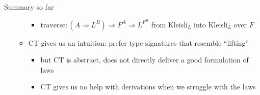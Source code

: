 \documentclass[english]{beamer}
\begin{document}
\begin{frame}{Summary so far}
\begin{itemize}
\begin{itemize}
\begin{itemize}
\item $\text{traverse}:\left(A\Rightarrow L^{B}\right)\Rightarrow F^{A}\Rightarrow L^{F^{B}}$
\textendash{} from Kleisli$_{L}$ into Kleisli$_{L}$ over $F$
\end{itemize}
\item CT gives us an intuition: prefer type signatures that resemble ``lifting''
\begin{itemize}
\item but CT is abstract, does not directly deliver a good formulation of
laws
\item CT gives us no help with derivations when we struggle with the laws
\end{itemize}
\end{itemize}
\end{itemize}
\end{frame}
\end{document}
